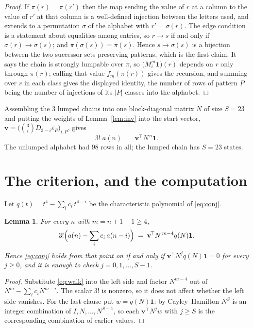 \documentclass[11pt,a4paper]{article}
\theoremstyle{plain}
\newtheorem{lemma}[theorem]{Lemma}
\theoremstyle{definition}
\begin{document}
\begin{proof}
If $\pi(r)=\pi(r')$ then the map sending the value of $r$ at a column to the value of $r'$
at that column is a well-defined injection between the letters used, and extends to a
permutation $\sigma$ of the alphabet with $r'=\sigma(r)$. The edge condition is a statement
about equalities among entries, so $r\to s$ if and only if $\sigma(r)\to\sigma(s)$; and
$\pi(\sigma(s))=\pi(s)$. Hence $s\mapsto\sigma(s)$ is a bijection between the two successor
sets preserving patterns, which is the first claim. It says the chain is strongly lumpable
over $\pi$, so $\bigl(M_i^{m}\mathbf{1}\bigr)(r)$ depends on $r$ only through $\pi(r)$;
calling that value $f_m(\pi(r))$ gives the recursion, and summing over $r$ in each class
gives the displayed identity, the number of rows of pattern $P$ being the number of
injections of its $|P|$ classes into the alphabet.
\end{proof}

Assembling the $3$ lumped chains into one block-diagonal matrix $N$ of size $S=23$ and
putting the weights of Lemma~\ref{lem:inv} into the start vector,
$\mathbf{v}=\bigl(\binom{3}{i}D_{3-i}\varepsilon_P\bigr)_{i,P}$, gives
\begin{equation}\label{eq:walk}
3!\;a(n)\;=\;\mathbf{v}^{\!\top}N^{\,n}\mathbf{1} .
\end{equation}
The unlumped alphabet had $98$ rows in all; the lumped chain has $S=23$ states.

\section{The criterion, and the computation}

Let $q(t)=t^{4}-\sum_i c_i\,t^{4-i}$ be the characteristic polynomial of
\eqref{eq:conj}.

\begin{lemma}\label{lem:crit}
For every $n$ with $m=n+1-1\ge4$,
\[
3!\Bigl(a(n)-\sum_i c_i\,a(n-i)\Bigr)\;=\;\mathbf{v}^{\!\top}N^{\,m-4}q(N)\mathbf{1} .
\]
Hence \eqref{eq:conj} holds from that point on if and only if
$\mathbf{v}^{\!\top}N^{j}q(N)\mathbf{1}=0$ for every $j\ge0$, and it is enough to check
$j=0,1,\dots,S-1$.
\end{lemma}

\begin{proof}
Substitute \eqref{eq:walk} into the left side and factor $N^{m-4}$ out of
$N^{m}-\sum_i c_iN^{m-i}$. The scalar $3!$ is nonzero, so it does not affect whether
the left side vanishes. For the last clause put $w=q(N)\mathbf{1}$: by Cayley--Hamilton
$N^{S}$ is an integer combination of $I,N,\dots,N^{S-1}$, so each
$\mathbf{v}^{\!\top}N^{j}w$ with $j\ge S$ is the corresponding combination of earlier
values.
\end{proof}
\end{document}
